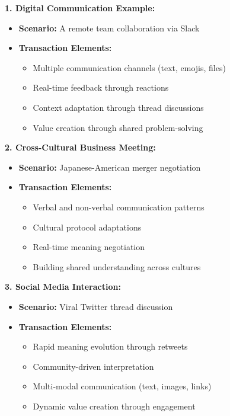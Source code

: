 \documentclass[12pt]{article}
\begin{document}
\begin{tcolorbox}[casestudybox]
\textbf{1. Digital Communication Example:}
\begin{itemize}
\item \textbf{Scenario:} A remote team collaboration via Slack
\item \textbf{Transaction Elements:}
  \begin{itemize}
  \item Multiple communication channels (text, emojis, files)
  \item Real-time feedback through reactions
  \item Context adaptation through thread discussions
  \item Value creation through shared problem-solving
  \end{itemize}
\end{itemize}

\textbf{2. Cross-Cultural Business Meeting:}
\begin{itemize}
\item \textbf{Scenario:} Japanese-American merger negotiation
\item \textbf{Transaction Elements:}
  \begin{itemize}
  \item Verbal and non-verbal communication patterns
  \item Cultural protocol adaptations
  \item Real-time meaning negotiation
  \item Building shared understanding across cultures
  \end{itemize}
\end{itemize}

\textbf{3. Social Media Interaction:}
\begin{itemize}
\item \textbf{Scenario:} Viral Twitter thread discussion
\item \textbf{Transaction Elements:}
  \begin{itemize}
  \item Rapid meaning evolution through retweets
  \item Community-driven interpretation
  \item Multi-modal communication (text, images, links)
  \item Dynamic value creation through engagement
  \end{itemize}
\end{itemize}


\end{tcolorbox}
\end{document}
